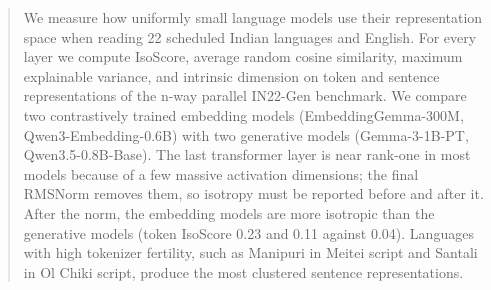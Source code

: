 \begin{abstract}
We measure how uniformly small language models use their representation space when reading 22 scheduled Indian languages and English. For every layer we compute IsoScore, average random cosine similarity, maximum explainable variance, and intrinsic dimension on token and sentence representations of the n-way parallel IN22-Gen benchmark. We compare two contrastively trained embedding models (EmbeddingGemma-300M, Qwen3-Embedding-0.6B) with two generative models (Gemma-3-1B-PT, Qwen3.5-0.8B-Base). The last transformer layer is near rank-one in most models because of a few massive activation dimensions; the final RMSNorm removes them, so isotropy must be reported before and after it. After the norm, the embedding models are more isotropic than the generative models (token IsoScore 0.23 and 0.11 against 0.04). Languages with high tokenizer fertility, such as Manipuri in Meitei script and Santali in Ol Chiki script, produce the most clustered sentence representations.
\end{abstract}
